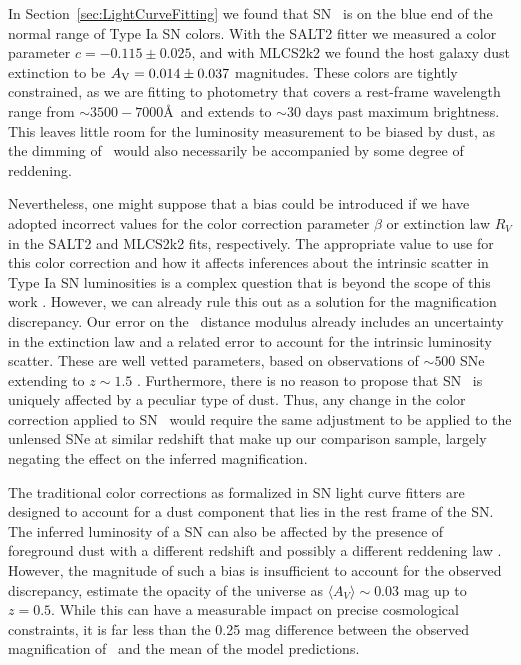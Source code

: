 In Section~\ref{sec:LightCurveFitting} we found that SN \tomas\ is on
the blue end of the normal range of Type Ia SN colors.  With the SALT2
fitter we measured a color parameter $c=-0.115\pm0.025$, and with
MLCS2k2 we found the host galaxy dust extinction to be $A_{\rm
V}=0.014\pm0.037$ magnitudes.  These colors are tightly constrained,
as we are fitting to photometry that covers a rest-frame wavelength
range from $\sim3500-7000$\AA\ and extends to $\sim$30 days past
maximum brightness.  This leaves little room for the luminosity
measurement to be biased by dust, as the dimming of \tomas\ would also
necessarily be accompanied by some degree of reddening. 

Nevertheless, one might suppose that a bias could be introduced if we
have adopted incorrect values for the color correction parameter
$\beta$ or extinction law $R_V$ in the SALT2 and MLCS2k2 fits,
respectively.  The appropriate value to use for this color correction
and how it affects inferences about the intrinsic scatter in Type Ia
SN luminosities is a complex question that is beyond the scope of this
work \citep[see
e.g.][]{Marriner:2011,Chotard:2011,Kessler:2013,Scolnic:2014a}.
However, we can already rule this out as a solution for the
magnification discrepancy.  Our error on the \tomas\ distance modulus
already includes an uncertainty in the extinction law and a related
error to account for the intrinsic luminosity scatter. These are well
vetted parameters, based on observations of $\sim500$ SNe extending
to $z\sim1.5$ \citep{Sullivan:2011}.  Furthermore, there is no reason
to propose that SN \tomas\ is uniquely affected by a peculiar type of
dust.  Thus, any change in the color correction applied to SN \tomas\
would require the same adjustment to be applied to the unlensed SNe at
similar redshift that make up our comparison sample, largely negating
the effect on the inferred magnification. 

The traditional color corrections as formalized in SN light curve
fitters are designed to account for a dust component that lies in the
rest frame of the SN.  The inferred luminosity of a SN can also be
affected by the presence of foreground dust with a different redshift
and possibly a different reddening law \citep{Menard:2010b}.  However,
the magnitude of such a bias is insufficient to account for the
observed discrepancy, \citet{Menard:2010a} estimate the opacity of the
universe as $\langle A_{V}\rangle\sim0.03$ mag up to $z=0.5$.  While
this can have a measurable impact on precise cosmological constraints,
it is far less than the 0.25 mag difference between the observed
magnification of \tomas\ and the mean of the model predictions.  



